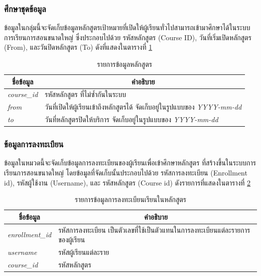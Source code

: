 \documentclass[conference]{IEEEtran}
\def\moocs{การเรียนการสอนขนาดใหญ่}
\def\MOOCs{ระบบ{\moocs}}
\newcommand*{\thead}[1]{\multicolumn{1}{c}{\bfseries #1}}
\begin{document}
    \subsubsection{ศึกษาชุดข้อมูล}
    ข้อมูลในกลุ่มนี้จะจัดเก็บข้อมูลหลักสูตรเป้าหมายที่เปิดให้ผู้เรียนทั่วไปสามารถเข้ามาศึกษาได้ใน{\MOOCs}
    ซึ่งประกอบไปด้วย รหัสหลักสูตร (Course ID), วันที่เริ่มเปิดหลักสูตร (From), 
    และวันปิดหลักสูตร (To) ดังที่แสดงในตารางที่ \ref{tab:course-feature} 

    \begin{table}[ht!]
        \caption[courseinfo]{รายการข้อมูลหลักสูตร}
        \label{tab:course-feature}
        \begin{tabular}{p{3cm} p{5cm}}
            \hline
            \thead{ชื่อข้อมูล} & \thead{คำอธิบาย} \\
            \hline
            \textit{course\_id} & รหัสหลักสูตร ที่ไม่ซ้ำกันในระบบ \\
            \textit{from}       & วันที่เปิดให้ผู้เรียนเข้าถึงหลักสูตรได้ จัดเก็บอยู่ในรูปแบบของ \textit{YYYY-mm-dd} \\
            \textit{to}         & วันที่หลักสูตรปิดให้บริการ จัดเก็บอยู่ในรูปแบบของ \textit{YYYY-mm-dd} \\
            \hline
        \end{tabular}
    \end{table}

    \subsubsection{ข้อมูลการลงทะเบียน}
    ข้อมูลในหมวดนี้จะจัดเก็บข้อมูลการลงทะเบียนของผู้เรียนเพื่อเข้าศึกษาหลักสูตร
    ที่สร้างขึ้นใน{\MOOCs} โดยข้อมูลที่จัดเก็บนั้นประกอบไปด้วย รหัสการลงทะเบียน (Enrollment id),
    รหัสผู้ใช้งาน (Username), และ รหัสหลักสูตร (Course id) ดังรายการที่แสดงในตารางที่
    \ref{tab:enrollment-feature}

    \begin{table}[ht!]
        \caption[enrollmentinfo]{รายการข้อมูลการลงทะเบียนเรียนในหลักสูตร}
        \label{tab:enrollment-feature}
        \begin{tabular}{p{3cm} p{5cm}}
            \hline
            \thead{ชื่อข้อมูล} & \thead{คำอธิบาย} \\
            \hline
            \textit{enrollment\_id} & รหัสการลงทะเบียน เป็นตัวเลขที่ใช้เป็นตัวแทนในการลงทะเบียนแต่ละรายการของผู้เรียน \\
            \textit{username}       & รหัสผู้เรียนแต่ละราย \\
            \textit{course\_id}     & รหัสหลักสูตร \\
            \hline
        \end{tabular}
    \end{table}
\end{document}
